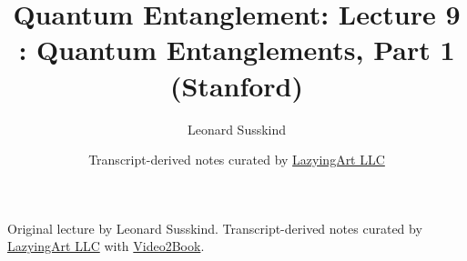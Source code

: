 \documentclass[11pt,oneside]{book}
\begin{document}
\frontmatter
\title{Quantum Entanglement: Lecture 9 : Quantum Entanglements, Part 1 (Stanford)}
\author{Leonard Susskind}
\date{Transcript-derived notes curated by \href{https://lazying.art}{LazyingArt LLC}}
\maketitle
\begin{center}
\small Original lecture by Leonard Susskind. Transcript-derived notes curated by \href{https://lazying.art}{LazyingArt LLC} with \href{https://github.com/lachlanchen/Video2Book}{Video2Book}.
\end{center}
\clearpage
\mainmatter

\end{document}
